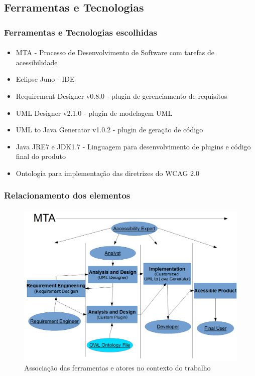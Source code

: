 \documentclass{beamer}
\begin{document}
\subsection[Ferramentas e Tecnologias]{Ferramentas e Tecnologias}

\begin{frame}
\frametitle{Ferramentas e Tecnologias escolhidas}
\framesubtitle{}

\begin{itemize}
  \item MTA - Processo de Desenvolvimento de Software com tarefas de acessibilidade
  \item Eclipse Juno - IDE
  \item Requirement Designer v0.8.0 - plugin de gerenciamento de requisitos
  \item UML Designer v2.1.0 - plugin de modelagem UML
  \item UML to Java Generator v1.0.2 - plugin de geração de código
  \item Java JRE7 e JDK1.7 - Linguagem para desenvolvimento de plugins e código final do produto
  \item Ontologia para implementação das diretrizes do WCAG 2.0
\end{itemize}

\end{frame}

\begin{frame}
\frametitle{Relacionamento dos elementos}
\framesubtitle{}

\begin{figure}[htbp] \centering
	\includegraphics[width=\textwidth,height=.65\textheight,keepaspectratio]{./img/developmentNew2.png}
	\caption{Associação das ferramentas e atores no contexto do trabalho}
	\label{fig:desenvolvimento}
\end{figure}

\end{frame}
\end{document}
